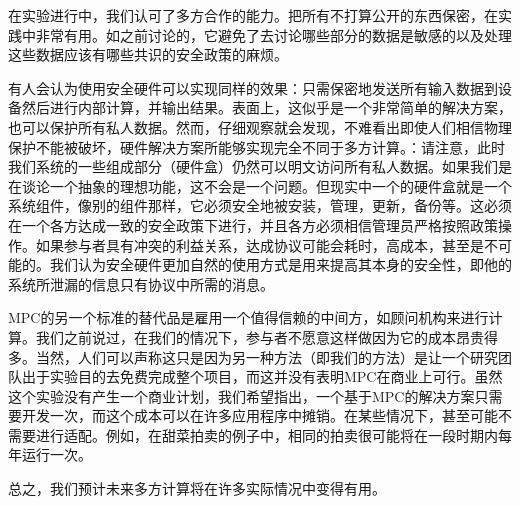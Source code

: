 在实验进行中，我们认可了多方合作的能力。把所有不打算公开的东西保密，在实践中非常有用。如之前讨论的，它避免了去讨论哪些部分的数据是敏感的以及处理这些数据应该有哪些共识的安全政策的麻烦。

有人会认为使用安全硬件可以实现同样的效果：只需保密地发送所有输入数据到设备然后进行内部计算，并输出结果。表面上，这似乎是一个非常简单的解决方案，也可以保护所有私人数据。然而，仔细观察就会发现，不难看出即使人们相信物理保护不能被破坏，硬件解决方案所能够实现完全不同于多方计算。：请注意，此时我们系统的一些组成部分（硬件盒）仍然可以明文访问所有私人数据。如果我们是在谈论一个抽象的理想功能，这不会是一个问题。但现实中一个的硬件盒就是一个系统组件，像别的组件那样，它必须安全地被安装，管理，更新，备份等。这必须在一个各方达成一致的安全政策下进行，并且各方必须相信管理员严格按照政策操作。如果参与者具有冲突的利益关系，达成协议可能会耗时，高成本，甚至是不可能的。我们认为安全硬件更加自然的使用方式是用来提高其本身的安全性，即他的系统所泄漏的信息只有协议中所需的消息。

MPC的另一个标准的替代品是雇用一个值得信赖的中间方，如顾问机构来进行计算。我们之前说过，在我们的情况下，参与者不愿意这样做因为它的成本昂贵得多。当然，人们可以声称这只是因为另一种方法（即我们的方法）是让一个研究团队出于实验目的去免费完成整个项目，而这并没有表明MPC在商业上可行。虽然这个实验没有产生一个商业计划，我们希望指出，一个基于MPC的解决方案只需要开发一次，而这个成本可以在许多应用程序中摊销。在某些情况下，甚至可能不需要进行适配。例如，在甜菜拍卖的例子中，相同的拍卖很可能将在一段时期内每年运行一次。

总之，我们预计未来多方计算将在许多实际情况中变得有用。



